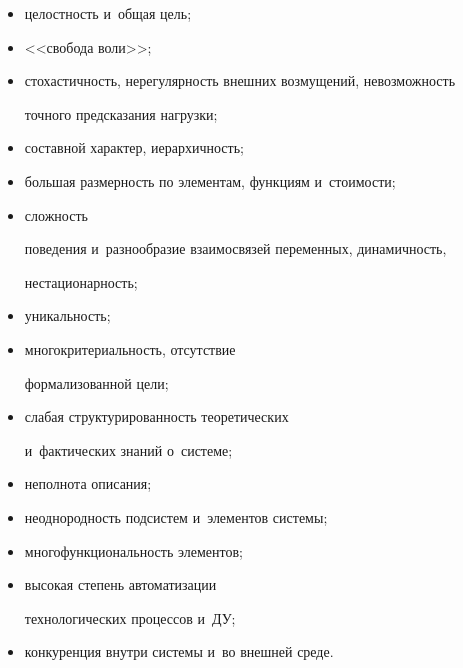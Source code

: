\begin{itemize}


\item целостность и~общая цель;\\[-14pt] 


\item <<свобода воли>>;\\[-14pt] 


\item стохастичность, нерегулярность внешних возмущений, невозможность 


точного предсказания нагрузки;\\[-14pt] 


\item составной характер, иерархичность;\\[-14pt] 


\item большая размерность по элементам, функциям и~стоимости;\\[-14pt] 


\item сложность 


поведения и~разнообразие взаимосвязей переменных, динамичность, 


нестационарность;\\[-14pt] 


\item уникальность;\\[-14pt] 


\item многокритериальность, отсутствие 


формализованной цели;\\[-14pt] 


\item слабая структурированность теоретических 


и~фактических знаний о~системе;\\[-14pt] 


\item неполнота описания;\\[-14pt] 


\item неоднородность подсистем и~элементов системы;\\[-14pt] 


\item многофункциональность элементов;\\[-14pt] 


\item высокая степень автоматизации 


технологических процессов и~ДУ;\\[-14pt] 


\item конкуренция внутри системы и~во внешней среде.


\end{itemize}


